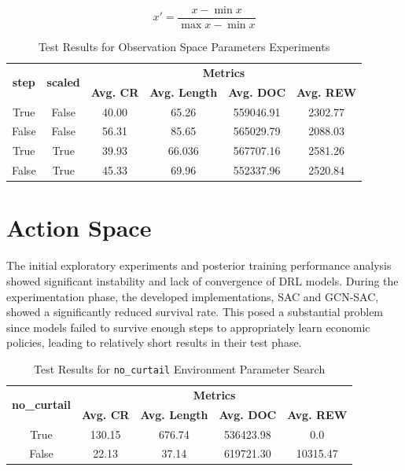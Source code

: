 \begin{equation}
	x' = \frac{x - \min x}{\max x - \min x}
\end{equation}

  \begin{table}[h!]
	\centering
	\caption{Test Results for Observation Space Parameters Experiments}
	\begin{tabular}{cccccc}
		\toprule
		\multirow{2}{*}{\textbf{step}} & \multirow{2}{*}{\textbf{scaled}} & \multicolumn{4}{c}{\textbf{Metrics}} \\ 
		\cmidrule(lr){3-6}
		& & \textbf{Avg. CR} & \textbf{Avg. Length} & \textbf{Avg. DOC} & \textbf{Avg. REW} \\ 
		\midrule
		
		True & False & 40.00 & 65.26 & 559046.91 & 2302.77 \\
		False & False  & 56.31 & 85.65 & 565029.79 & 2088.03 \\
		True & True & 39.93 & 66.036 & 567707.16  & 2581.26 \\
		False & True & 45.33 & 69.96 & 552337.96 & 2520.84 \\
		\bottomrule
	\end{tabular}
	\label{tab:test-obs}
\end{table}


\section{Action Space} \label{sec:results-action}

The initial exploratory experiments and posterior training performance analysis showed significant instability and lack of convergence of \ac{DRL} models. During the experimentation phase, the developed implementations, SAC and GCN-SAC, showed a significantly reduced survival rate. This posed a substantial problem since models failed to survive enough steps to appropriately learn economic policies, leading to relatively short results in their test phase. \par

\begin{table}[h!]
	\centering
	\caption{Test Results for \texttt{no\_curtail} Environment Parameter Search}
	\begin{tabular}{ccccc}
		\toprule
		\multirow{2}{*}{\textbf{no\_curtail}} & \multicolumn{4}{c}{\textbf{Metrics}} \\ 
		\cmidrule(lr){2-5}
		&  \textbf{Avg. CR} & \textbf{Avg. Length} & \textbf{Avg. DOC} & \textbf{Avg. REW} \\ 
		\midrule
		True & 130.15 & 676.74 & 536423.98 & 0.0 \\
		False & 22.13 & 37.14 & 619721.30  & 10315.47  \\
		\bottomrule
	\end{tabular}
	\label{tab:test-curtail}
\end{table}

